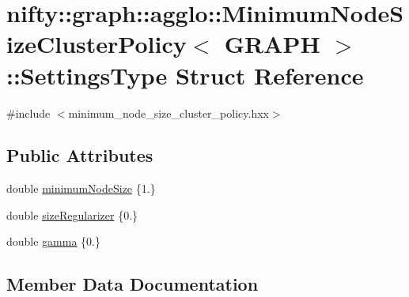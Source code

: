 \hypertarget{structnifty_1_1graph_1_1agglo_1_1MinimumNodeSizeClusterPolicy_1_1SettingsType}{}\section{nifty\+:\+:graph\+:\+:agglo\+:\+:Minimum\+Node\+Size\+Cluster\+Policy$<$ G\+R\+A\+P\+H $>$\+:\+:Settings\+Type Struct Reference}
\label{structnifty_1_1graph_1_1agglo_1_1MinimumNodeSizeClusterPolicy_1_1SettingsType}


{\ttfamily \#include $<$minimum\+\_\+node\+\_\+size\+\_\+cluster\+\_\+policy.\+hxx$>$}

\subsection*{Public Attributes}
\begin{DoxyCompactItemize}
\item 
double \hyperlink{structnifty_1_1graph_1_1agglo_1_1MinimumNodeSizeClusterPolicy_1_1SettingsType_ab282c9efb91cfaa63a2052694291bbc6}{minimum\+Node\+Size} \{1.\}
\item 
double \hyperlink{structnifty_1_1graph_1_1agglo_1_1MinimumNodeSizeClusterPolicy_1_1SettingsType_a2b5ed9ffa611e37a818f32186cc39d24}{size\+Regularizer} \{0.\}
\item 
double \hyperlink{structnifty_1_1graph_1_1agglo_1_1MinimumNodeSizeClusterPolicy_1_1SettingsType_accfd8d8dc5d46ac1d15e22b529772e0d}{gamma} \{0.\}
\end{DoxyCompactItemize}


\subsection{Member Data Documentation}
\hypertarget{structnifty_1_1graph_1_1agglo_1_1MinimumNodeSizeClusterPolicy_1_1SettingsType_accfd8d8dc5d46ac1d15e22b529772e0d}{}
